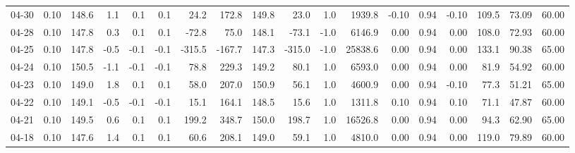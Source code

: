 \begin{threeparttable}
{\begin{tabular}{lrrrrrrrrrrrrrrrrr}
  04-30 &     0.10 & 148.6 &               1.1 &               0.1 &                0.1 &               24.2 &  172.8 & 149.8 &       23.0 &                      1.0 &              1939.8 &      -0.10 &      0.94 &          -0.10 &            109.5 &           73.09 &                  60.00 \\
  04-28 &     0.10 & 147.8 &               0.3 &               0.1 &                0.1 &              -72.8 &   75.0 & 148.1 &      -73.1 &                     -1.0 &              6146.9 &       0.00 &      0.94 &           0.00 &            108.0 &           72.93 &                  60.00 \\
  04-25 &     0.10 & 147.8 &              -0.5 &              -0.1 &               -0.1 &             -315.5 & -167.7 & 147.3 &     -315.0 &                     -1.0 &             25838.6 &       0.00 &      0.94 &           0.00 &            133.1 &           90.38 &                  65.00 \\
  04-24 &     0.10 & 150.5 &              -1.1 &              -0.1 &               -0.1 &               78.8 &  229.3 & 149.2 &       80.1 &                      1.0 &              6593.0 &       0.00 &      0.94 &           0.00 &             81.9 &           54.92 &                  60.00 \\
  04-23 &     0.10 & 149.0 &               1.8 &               0.1 &                0.1 &               58.0 &  207.0 & 150.9 &       56.1 &                      1.0 &              4600.9 &       0.00 &      0.94 &          -0.10 &             77.3 &           51.21 &                  65.00 \\
  04-22 &     0.10 & 149.1 &              -0.5 &              -0.1 &               -0.1 &               15.1 &  164.1 & 148.5 &       15.6 &                      1.0 &              1311.8 &       0.10 &      0.94 &           0.10 &             71.1 &           47.87 &                  60.00 \\
  04-21 &     0.10 & 149.5 &               0.6 &               0.1 &                0.1 &              199.2 &  348.7 & 150.0 &      198.7 &                      1.0 &             16526.8 &       0.00 &      0.94 &           0.00 &             94.3 &           62.90 &                  65.00 \\
  04-18 &     0.10 & 147.6 &               1.4 &               0.1 &                0.1 &               60.6 &  208.1 & 149.0 &       59.1 &                      1.0 &              4810.0 &       0.00 &      0.94 &           0.00 &            119.0 &           79.89 &                  60.00 \\

\end{tabular}}
\end{threeparttable}
